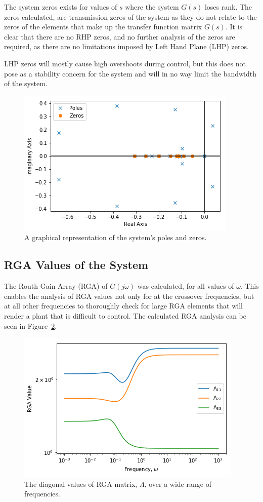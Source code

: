 The system zeros exists for values of $s$ where the system $G(s)$ loses rank. The zeros calculated, are transmission zeros of the system as they do not relate to the zeros of the elements that make up the transfer function matrix $G(s)$. It is clear that there are no RHP zeros, and no further analysis of the zeros are required, as there are no limitations imposed by Left Hand Plane (LHP) zeros. 

LHP zeros will mostly cause high overshoots during control, but this does not pose as a stability concern for the system and will in no way limit the bandwidth of the system.

\begin{figure}[H]
	\centering
	\includegraphics[width=0.7\linewidth]{Figures/Poles_and_Zeros}
	\caption{A graphical representation of the system's poles and zeros.}
	\label{fig:polesandzeros}
\end{figure}

\subsection{RGA Values of the System}
\label{sec:RGA Calculation}

The Routh Gain Array (RGA) of $G(j\omega)$ was calculated, for all values of $\omega$. This enables the analysis of RGA values not only for at the crossover frequencies, but at all other frequencies to thoroughly check for large RGA elements that will render a plant that is difficult to control. The calculated RGA analysis can be seen in Figure~\ref{fig:rga-values}.

\begin{figure}[H]
	\centering
	\includegraphics[width=0.7\linewidth]{"Figures/RGA Values"}
	\caption{The diagonal values of RGA matrix, $\Lambda$, over a wide range of frequencies.}
	\label{fig:rga-values}
\end{figure}

